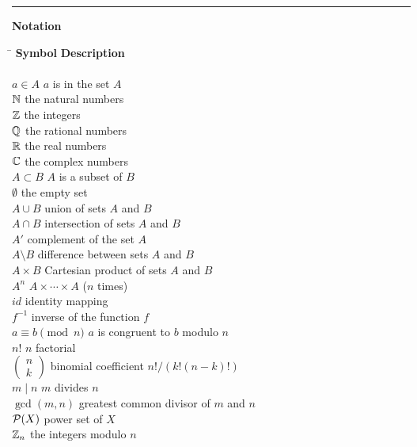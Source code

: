 

\pagestyle{empty}




 { \parindent 0pt \centering%
 \hrule height .5pt\vspace{40pt}
 \huge \bf Notation\par
 \nobreak \vskip 40pt \framebox[\hsize]{\hspace*{1in}}}




 
\begin{tabbing}
\hspace{1.9775in} \= \kill
{\bf Symbol}  \>  {\bf Description} \\
     \mbox{\hspace*{1in}} \\
$a \in A$ \>  $a$ is in the set $A$ \\
${\Bbb N}$ \>  the natural numbers \\
${\Bbb Z}$ \>  the integers \\
${\Bbb Q}$ \>  the rational numbers \\
${\Bbb R}$ \>  the real numbers \\
${\Bbb C}$ \>  the complex numbers \\
$A \subset B$ \>  $A$ is a subset of $B$ \\
$\emptyset$ \>  the empty set \\
$A \cup B$ \>  union of sets $A$ and $B$ \\
$A \cap B$ \>  intersection of sets $A$ and $B$ \\
$A'$ \>  complement of the  set $A$ \\
$A \setminus B$ \>  difference between sets $A$ and $B$ \\
$A \times B$ \>  Cartesian product of sets $A$ and $B$ \\
$A^n$ \>  $A \times \cdots \times A$ ($n$ times) \\
$id$ \>  identity mapping \\
$f^{-1}$ \>  inverse of the function $f$	\\
$a \equiv b \pmod{n}$ \>  $a$ is congruent to $b$ modulo $n$ \\
$n!$ \>  $n$ factorial \\
$\left(\begin{array}{c}n \\ k \end{array} \right)$ \>  binomial
     coefficient $n!/(k! (n-k)!)$ \\
$m \mid n$ \>  $m$ divides $n$ \\
$\gcd(m, n)$ \>  greatest common divisor of $m$ and $n$ \\
${\cal P}(X)$ \>  power set of $X$ \\
${\Bbb Z}_n$ \>  the integers modulo $n$ \\
\end{tabbing} \clearpage
